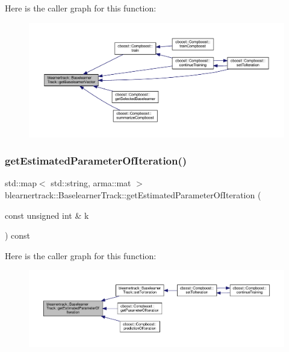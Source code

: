 Here is the caller graph for this function\+:\nopagebreak
\begin{figure}[H]
\begin{center}
\leavevmode
\includegraphics[width=350pt]{classblearnertrack_1_1_baselearner_track_a596429982bd5fb1c8ffabc5f93849235_icgraph}
\end{center}
\end{figure}
\mbox{\label{classblearnertrack_1_1_baselearner_track_a9b0678ef3573206959be2068d115c556}} 
\subsubsection{\texorpdfstring{get\+Estimated\+Parameter\+Of\+Iteration()}{getEstimatedParameterOfIteration()}}
{\footnotesize\ttfamily std\+::map$<$ std\+::string, arma\+::mat $>$ blearnertrack\+::\+Baselearner\+Track\+::get\+Estimated\+Parameter\+Of\+Iteration (\begin{DoxyParamCaption}\item[{const unsigned int \&}]{k }\end{DoxyParamCaption}) const}

Here is the caller graph for this function\+:
\nopagebreak
\begin{figure}[H]
\begin{center}
\leavevmode
\includegraphics[width=350pt]{classblearnertrack_1_1_baselearner_track_a9b0678ef3573206959be2068d115c556_icgraph}
\end{center}
\end{figure}
\mbox{\label{classblearnertrack_1_1_baselearner_track_a0ba8e3943b998b58375b892f40f12c73}} 
